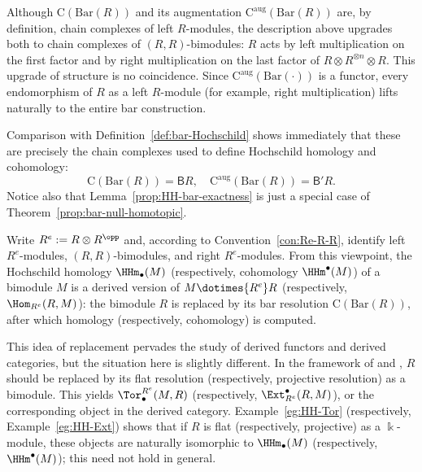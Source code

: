 \begin{example}
	Although $\mathrm{C}(\mathrm{Bar}(R))$ and its augmentation
	$\mathrm{C}^{\mathrm{aug}}(\mathrm{Bar}(R))$ are, by definition, chain
	complexes of left $R$-modules, the description above upgrades both to
	chain complexes of $(R,R)$-bimodules: $R$ acts by left multiplication on
	the first factor and by right multiplication on the last factor of
	$R\otimes R^{\otimes n}\otimes R$. This upgrade of structure is no
	coincidence. Since $\mathrm{C}^{\mathrm{aug}}(\mathrm{Bar}(\mathord\cdot))$
	is a functor, every endomorphism of $R$ as a left $R$-module (for example,
	right multiplication) lifts naturally to the entire bar construction.

	Comparison with Definition~\ref{def:bar-Hochschild} shows immediately
	that these are precisely the chain complexes used to define Hochschild
	homology and cohomology:
	\[ \mathrm{C}(\mathrm{Bar}(R)) = \mathsf{B} R, \quad \mathrm{C}^{\mathrm{aug}}(\mathrm{Bar}(R)) = \mathsf{B}' R. \]
	Notice also that Lemma~\ref{prop:HH-bar-exactness} is just a special case
	of Theorem~\ref{prop:bar-null-homotopic}.

	Write $R^e:=R\otimes R^{\opp}$ and, according to
	Convention~\ref{con:Re-R-R}, identify left $R^e$-modules,
	$(R,R)$-bimodules, and right $R^e$-modules. From this viewpoint, the
	Hochschild homology $\HHm_\bullet(M)$ (respectively, cohomology
	$\HHm^\bullet(M)$) of a bimodule $M$ is a derived version of
	$M\dotimes{R^e}R$ (respectively, $\Hom_{R^e}(R,M)$): the bimodule $R$ is
	replaced by its bar resolution $\mathrm{C}(\mathrm{Bar}(R))$, after which
	homology (respectively, cohomology) is computed.

	This idea of replacement pervades the study of derived functors and
	derived categories, but the situation here is slightly different. In the
	framework of  and ,
	$R$ should be replaced by its flat resolution (respectively, projective
	resolution) as a bimodule. This yields $\Tor^{R^e}_\bullet(M,R)$
	(respectively, $\Ext^\bullet_{R^e}(R,M)$), or the corresponding object in
	the derived category. Example~\ref{eg:HH-Tor} (respectively,
	Example~\ref{eg:HH-Ext}) shows that if $R$ is flat (respectively,
	projective) as a $\Bbbk$-module, these objects are naturally isomorphic to
	$\HHm_\bullet(M)$ (respectively, $\HHm^\bullet(M)$); this need not hold
	in general.
\end{example}

